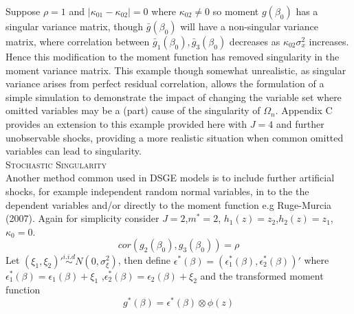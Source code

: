 \documentclass[11pt, fleqn]{article}
\begin{document}
Suppose $\rho=1$ and $|\kappa_{01}-\kappa_{02}|=0$  where $\kappa_{02}\neq 0$   so moment $g(\beta_0)$ has a singular variance matrix, though $\bar{g}(\beta_0)$ will have a non-singular variance matrix, where correlation between $\bar{g}_1(\beta_0),\bar{g}_3(\beta_0)$  decreases as $\kappa_{02}\sigma_x^2$ increases. Hence this modification to the moment function has removed singularity in the moment variance matrix. This  example though somewhat unrealistic, as singular variance arises from perfect residual correlation,  allows the formulation of a simple simulation to demonstrate the impact of changing the variable set where omitted variables may be a (part) cause of the singularity  of $\Omega_n$. Appendix C provides an extension to this example provided here with $J=4$ and further unobservable shocks, providing a more realistic situation when common omitted variables can lead to singularity. \\



\textsc{Stochastic Singularity}\\

Another method common used in DSGE models is to include further artificial shocks, for example independent random normal variables, in to the the dependent variables and/or directly to the moment function e.g Ruge-Murcia (2007). Again for simplicity consider  $J=2$,$m^*=2$, $h_1(z)=z_2$,$h_2(z)=z_1$, $\kappa_0=0$.
\begin{equation}cor(g_2(\beta_0),g_3(\beta_0))=\rho \end{equation}
Let $(\xi_1,\xi_2)' \overset{i.i.d}{\sim} N(0,\sigma^2_{\xi})$, then define $ \epsilon^*(\beta)= (\epsilon_1^*(\beta),\epsilon_2^*(\beta))'$ where $\epsilon_1^*(\beta)=\epsilon_1(\beta)+\xi_1$ ,$ \epsilon_2^*(\beta)=\epsilon_2(\beta)+\xi_2 $ and the transformed moment function
\begin{equation} g^*(\beta)=\epsilon^*(\beta) \otimes \phi(z) \end{equation}
\end{document}
